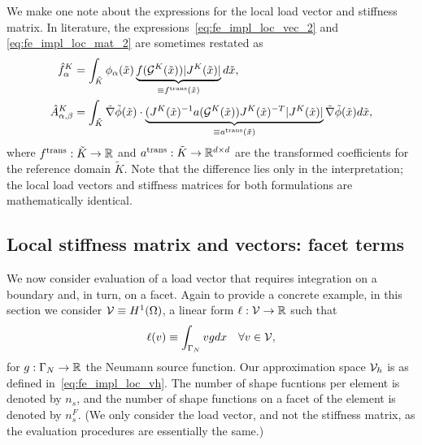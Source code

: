 We make one note about the expressions for the local load vector and stiffness matrix.  In literature, the expressions~\eqref{eq:fe_impl_loc_vec_2} and \eqref{eq:fe_impl_loc_mat_2} are sometimes restated as
\begin{align*}
  \hat f^K_\alpha
  &=
  \int_{\tilde K} \phi_\alpha(\tilde x) \underbrace{ f(\mathcal{G}^K(\tilde x)) |J^K(\tilde x)| }_{\equiv f^{\rm trans}(\tilde x)}d \tilde x, \\
  \hat A^K_{\alpha,\beta}
  &=
  \int_{\tilde K} \tilde \nabla \tilde \phi(\tilde x)
  \cdot  \underbrace{ (J^K(\tilde x)^{-1} a(\mathcal{G}^K(\tilde x)) J^K(\tilde x)^{-T} |J^K(\tilde x)| }_{\equiv  a^{\rm trans}(\tilde x)}\tilde \nabla \tilde \phi(\tilde x)  d\tilde x,
\end{align*}
where $f^{\rm trans}: \tilde K \to \mathbb{R}$  and $a^{\rm trans}:\tilde K \to \mathbb{R}^{d \times d}$ are the transformed coefficients for the reference domain $\tilde K$. Note that the difference lies only in the interpretation; the local load vectors and stiffness matrices for both formulations are mathematically identical.

\subsection{Local stiffness matrix and vectors: facet terms}
We now consider evaluation of a load vector that requires integration on a boundary and, in turn, on a facet.  Again to provide a concrete example, in this section we consider $\mathcal{V} \equiv H^1(\Omega)$, a linear form $\ell: \mathcal{V} \to \mathbb{R}$ such that
\begin{equation}
  \ell(v) \equiv \int_{\Gamma_N} v g dx \quad \forall v \in \mathcal{V},
  \label{eq:fe_impl_model_g}
\end{equation}
for $g: \Gamma_N \to \mathbb{R}$ the Neumann source function. Our approximation space $\mathcal{V}_h$ is as defined in~\eqref{eq:fe_impl_loc_vh}.  The number of shape fucntions per element is denoted by $n_s$, and the number of shape functions on a facet of the element is denoted by $n_s^F$.  (We only consider the load vector, and not the stiffness matrix, as the evaluation procedures are essentially the same.)

